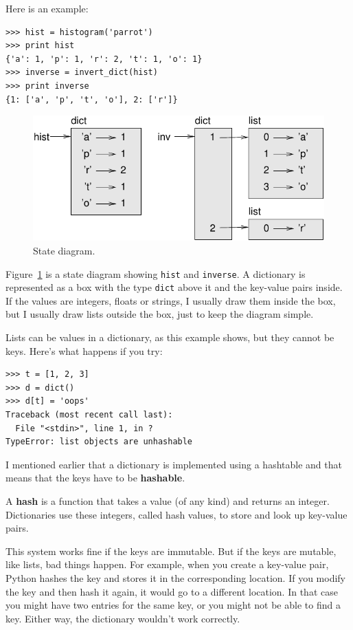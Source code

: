 \documentclass[10pt]{book}
\begin{document}
\begin{CJK}{UTF8}{gbsn}
Here is an example:

\begin{verbatim}
>>> hist = histogram('parrot')
>>> print hist
{'a': 1, 'p': 1, 'r': 2, 't': 1, 'o': 1}
>>> inverse = invert_dict(hist)
>>> print inverse
{1: ['a', 'p', 't', 'o'], 2: ['r']}
\end{verbatim}

\begin{figure}
\centerline
{\includegraphics[scale=0.8]{figs/dict1.pdf}}
\caption{State diagram.}
\label{fig.dict1}
\end{figure}

Figure~\ref{fig.dict1} is a state diagram showing {\tt hist} and {\tt inverse}.
A dictionary is represented as a box with the type {\tt dict} above it
and the key-value pairs inside.  If the values are integers, floats or
strings, I usually draw them inside the box, but I usually draw lists
outside the box, just to keep the diagram simple.

Lists can be values in a dictionary, as this example shows, but they
cannot be keys.  Here's what happens if you try:


\begin{verbatim}
>>> t = [1, 2, 3]
>>> d = dict()
>>> d[t] = 'oops'
Traceback (most recent call last):
  File "<stdin>", line 1, in ?
TypeError: list objects are unhashable
\end{verbatim}
%
I mentioned earlier that a dictionary is implemented using
a hashtable and that means that the keys have to be {\bf hashable}.

A {\bf hash} is a function that takes a value (of any kind)
and returns an integer.  Dictionaries use these integers,
called hash values, to store and look up key-value pairs.

This system works fine if the keys are immutable.  But if the
keys are mutable, like lists, bad things happen.  For example,
when you create a key-value pair, Python hashes the key and 
stores it in the corresponding location.  If you modify the
key and then hash it again, it would go to a different location.
In that case you might have two entries for the same key,
or you might not be able to find a key.  Either way, the
dictionary wouldn't work correctly.


\end{CJK}
\end{document}
